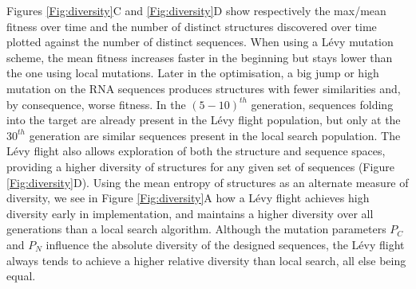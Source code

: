 Figures  \ref{Fig:diversity}C and  \ref{Fig:diversity}D show respectively the max/mean fitness over time and the number of distinct structures discovered over time plotted against the number of distinct sequences. When using a Lévy mutation scheme, the mean fitness increases faster in the beginning but stays lower than the one using local mutations. Later in the optimisation, a big jump or high mutation on the RNA sequences produces structures with fewer similarities and, by consequence, worse fitness. In the $(5-10)^{th}$ generation, sequences folding into the target are already present in the Lévy flight population, but only at the $30^{th}$ generation are similar sequences present in the local search population. The Lévy flight also allows exploration of both the structure and sequence spaces, providing a higher diversity of structures for any given set of sequences (Figure \ref{Fig:diversity}D). Using the mean entropy of structures as an alternate measure of diversity, we see in Figure \ref{Fig:diversity}A how a Lévy flight achieves high diversity early in implementation, and maintains a higher diversity over all generations than a local search algorithm. Although the mutation parameters $P_C$ and $P_N$ influence the absolute diversity of the designed sequences, the Lévy flight always tends to achieve a higher relative diversity than local search, all else being equal. 


